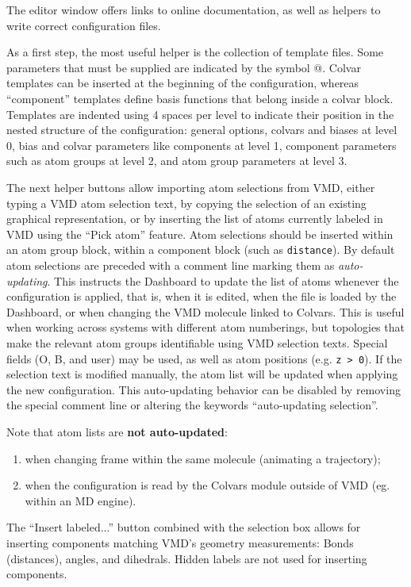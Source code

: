 {The editor window offers links to online documentation, as well as helpers to write correct configuration files.

As a first step, the most useful helper is the collection of template files.
Some parameters that must be supplied are indicated by the symbol @.
Colvar templates can be inserted at the beginning of the configuration, whereas ``component'' templates define basis functions that belong inside a colvar block.
Templates are indented using 4 spaces per level to indicate their position in the nested structure of the configuration: general options, colvars and biases at level 0,
bias and colvar parameters like components at level 1, component parameters such as atom groups at level 2, and atom group parameters at level 3.

The next helper buttons allow importing atom selections from VMD, either typing a VMD atom selection text, by copying the selection of an existing graphical representation, or by inserting the list of atoms currently labeled in VMD using the ``Pick atom'' feature.
Atom selections should be inserted within an atom group block, within a component block (such as \texttt{distance}).
By default atom selections are preceded with a comment line marking them as \emph{auto-updating}.
This instructs the Dashboard to update the list of atoms whenever the configuration is applied, that is, when it is edited, when the file is loaded by the Dashboard, or when changing the VMD molecule linked to Colvars.
This is useful when working across systems with different atom numberings, but topologies that make the relevant atom groups identifiable using VMD selection texts.
Special fields (O, B, and user) may be used, as well as atom positions (e.g. \texttt{z > 0}).
If the selection text is modified manually, the atom list will be updated when applying the new configuration.
This auto-updating behavior can be disabled by removing the special comment line or altering the keywords ``auto-updating selection''.

Note that atom lists are \textbf{not auto-updated}:
\begin{enumerate}
  \item when changing frame within the same molecule (animating a trajectory);
  \item when the configuration is read by the Colvars module outside of VMD (eg. within an MD engine).
\end{enumerate}

The ``Insert labeled...'' button combined with the selection box allows for inserting components matching VMD's geometry measurements: Bonds (distances), angles, and dihedrals.
Hidden labels are not used for inserting components.

}
